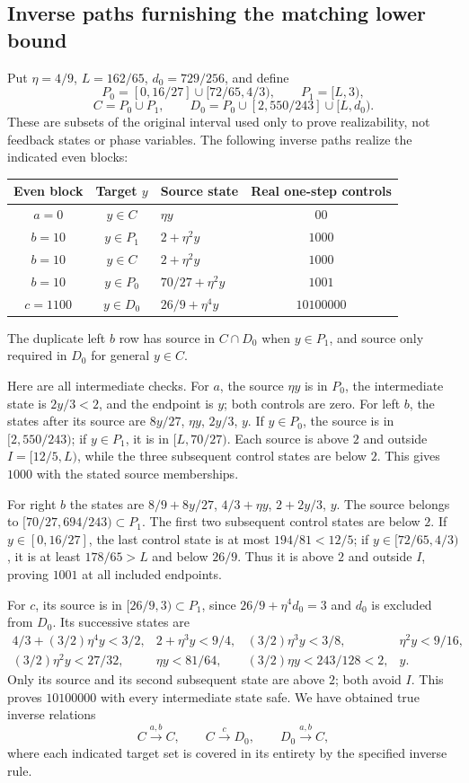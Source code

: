 \documentclass[11pt,reqno]{amsart}
\numberwithin{equation}{section}
\theoremstyle{definition}
\begin{document}
\subsection*{Inverse paths furnishing the matching lower bound}
Put $\eta=4/9$, $L=162/65$, $d_0=729/256$, and define
\[
 P_0=[0,16/27]\cup[72/65,4/3),\qquad P_1=[L,3),
\]
\[
 C=P_0\cup P_1,\qquad
 D_0=P_0\cup[2,550/243]\cup[L,d_0).
\]
These are subsets of the original interval used only to prove
realizability, not feedback states or phase variables. The following
inverse paths realize the indicated even blocks:
\begin{center}
\begin{tabular}{cclc}
\toprule
Even block&Target $y$&Source state&Real one-step controls\\
\midrule
$a=0$&$y\in C$&$\eta y$&$00$\\
$b=10$&$y\in P_1$&$2+\eta^2y$&$1000$\\
$b=10$&$y\in C$&$2+\eta^2y$&$1000$\\
$b=10$&$y\in P_0$&$70/27+\eta^2y$&$1001$\\
$c=1100$&$y\in D_0$&$26/9+\eta^4y$&$10100000$\\
\bottomrule
\end{tabular}
\end{center}
The duplicate left $b$ row has source in $C\cap D_0$ when
$y\in P_1$, and source only required in $D_0$ for general
$y\in C$.

Here are all intermediate checks. For $a$, the source
$\eta y$ is in $P_0$, the intermediate state is $2y/3<2$,
and the endpoint is $y$; both controls are zero.
For left $b$, the states after its source are
$8y/27$, $\eta y$, $2y/3$, $y$. If $y\in P_0$, the
source is in $[2,550/243)$; if $y\in P_1$, it is in
$[L,70/27)$. Each source is above $2$ and outside
$I=[12/5,L)$, while the three subsequent control states are
below $2$. This gives $1000$ with the stated source memberships.

For right $b$ the states are
$8/9+8y/27$, $4/3+\eta y$, $2+2y/3$, $y$.
The source belongs to $[70/27,694/243)\subset P_1$.
The first two subsequent control states are below $2$.
If $y\in[0,16/27]$, the last control state is at most
$194/81<12/5$; if $y\in[72/65,4/3)$, it is at least
$178/65>L$ and below $26/9$. Thus it is above $2$ and
outside $I$, proving $1001$ at all included endpoints.

For $c$, its source is in $[26/9,3)\subset P_1$, since
$26/9+\eta^4d_0=3$ and $d_0$ is excluded from $D_0$.
Its successive states are
\[
\begin{array}{llll}
4/3+(3/2)\eta^4y<3/2,&2+\eta^3y<9/4,&
(3/2)\eta^3y<3/8,&\eta^2y<9/16,\\
(3/2)\eta^2y<27/32,&\eta y<81/64,&
(3/2)\eta y<243/128<2,&y.
\end{array}
\]
Only its source and its second subsequent state are above $2$;
both avoid $I$. This proves $10100000$ with every intermediate
state safe. We have obtained true inverse relations
\[
 C\xrightarrow{a,b}C,\qquad C\xrightarrow cD_0,
 \qquad D_0\xrightarrow{a,b}C,
\]
where each indicated target set is covered in its entirety by the
specified inverse rule.
\end{document}
